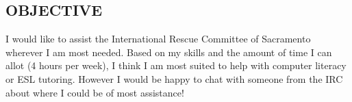 \documentclass[line,margin,10pt]{res}
\begin{document}
\begin{resume}

\section{OBJECTIVE}
I would like to assist the International Rescue Committee of Sacramento wherever I am most needed. Based on my skills and the amount of time I can allot (4 hours per week), I think I am most suited to help with computer literacy or ESL tutoring. However I would be happy to chat with someone from the IRC about where I could be of most assistance!


\end{resume}
\end{document}

